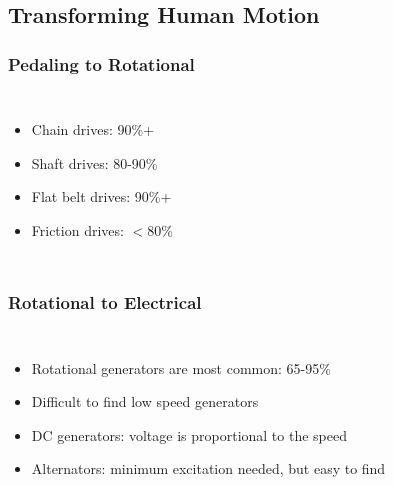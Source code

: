 \documentclass[]{beamer}
\begin{document}
\subsection{Transforming Human Motion}
\frame
{
    \frametitle{Pedaling to Rotational}
    \begin{columns}[t]
        \column{6cm}
        \begin{itemize}
            \item<1->\alert<1>{Chain drives: 90\%+}
            \item<1->\alert<2>{Shaft drives: 80-90\%}
            \item<1->\alert<3>{Flat belt drives: 90\%+}
            \item<1->\alert<4>{Friction drives: $<$80\%}
        \end{itemize}
        \column{5cm}
    \end{columns}
}
\frame
{
    \frametitle{Rotational to Electrical}
    \begin{columns}[t]
        \column{6cm}
        \begin{itemize}[<+->]
            \item Rotational generators are most common: 65-95\%
            \item Difficult to find low speed generators
            \item DC generators: voltage is proportional to the speed
            \item Alternators: minimum excitation needed, but easy to find
        \end{itemize}
        \column{5cm}
    \end{columns}
}
\end{document}
